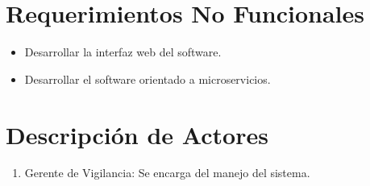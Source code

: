 \section{Requerimientos No Funcionales}
\begin{itemize}
    \item Desarrollar la interfaz web del software.
    \item Desarrollar el software orientado a microservicios.
\end{itemize}

    
\section{Descripción de Actores}
\begin{enumerate}
    \item Gerente de Vigilancia: Se encarga del manejo del sistema. 
\end{enumerate}
